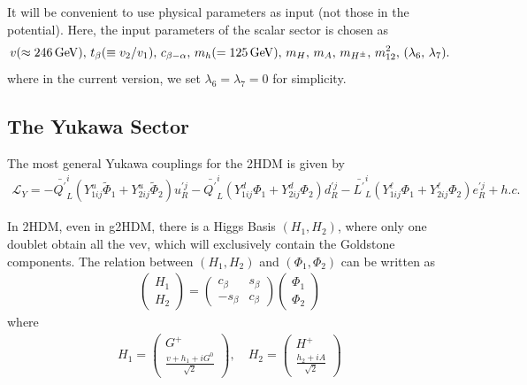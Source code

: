 \documentclass[12pt]{article}
\begin{document}
It will be convenient to use physical parameters as input (not those in the potential). Here, the input parameters of the scalar sector is chosen as
\begin{align}
    v(\approx 246\,{\rm GeV}),\, t_\beta(\equiv v_2/v_1),\, c_{\beta-\alpha},\, m_h(=125\,{\rm GeV}),\, m_H,\, m_A,\, m_{H^\pm},\, m_{12}^2,\,(\lambda_6,\,\lambda_7).
\end{align}
where in the current version, we set $\lambda_6=\lambda_7=0$ for simplicity.


\subsection{The Yukawa Sector}
The most general Yukawa couplings for the 2HDM is given by
\begin{align}
\mathcal{L}_{Y} = - \bar{Q^{\prime}}_{L}^{i}(Y_{1ij}^{u}\tilde{\Phi}_{1}+Y_{2ij}^{u}\tilde{\Phi}_{2})u_{R}^{\prime j} - \bar{Q^{\prime}}_{L}^{i}(Y_{1ij}^{d}\Phi_{1}+Y_{2ij}^{d}\Phi_{2})d_{R}^{\prime j} - \bar{L^{\prime}}_{L}^{i}(Y_{1ij}^{\ell}\Phi_{1}+Y_{2ij}^{\ell}\Phi_{2})e_{R}^{\prime j}+ h.c.
\end{align}

In 2HDM, even in g2HDM, there is a Higgs Basis $(H_{1},H_{2})$, where only one doublet obtain all the vev, which will exclusively contain the Goldstone components. The relation between $(H_{1},H_{2})$ and $(\Phi_{1},\Phi_{2})$ can be written as
\begin{align}
\begin{pmatrix}
H_{1} \\
H_{2}
\end{pmatrix} = \begin{pmatrix}
c_{\beta} & s_{\beta} \\
-s_{\beta} & c_{\beta}
\end{pmatrix}\begin{pmatrix}
\Phi_{1} \\
\Phi_{2}
\end{pmatrix}
\end{align}
where
\begin{align}
H_{1} = \begin{pmatrix}
G^{+}  \\
\frac{v+h_{1}+i G^{0}}{\sqrt{ 2 }}
\end{pmatrix}, \quad H_{2}=\begin{pmatrix}
H^{+} \\
\frac{h_{2}+iA}{\sqrt{ 2 }}
\end{pmatrix}
\end{align}
\end{document}
